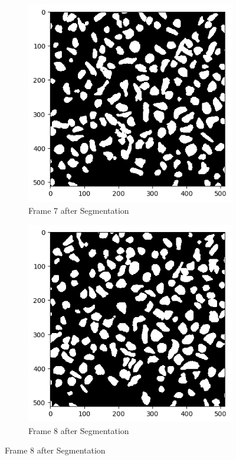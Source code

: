 \documentclass{article}
\begin{document}
\begin{figure}[h!]
  \centering
  \begin{subfigure}{0.4\textwidth}
    \includegraphics[width=\linewidth]{Report/Appendix_Images/Segmentation-B-Growth/frame_7.png}
    \caption*{Frame 7 after Segmentation}
  \end{subfigure}
  \hfill
  \begin{subfigure}{0.4\textwidth}
    \includegraphics[width=\linewidth]{Report/Appendix_Images/Segmentation-B-Growth/frame_8.png}
    \caption*{Frame 8 after Segmentation}
  \end{subfigure}


\end{figure}
\end{document}
